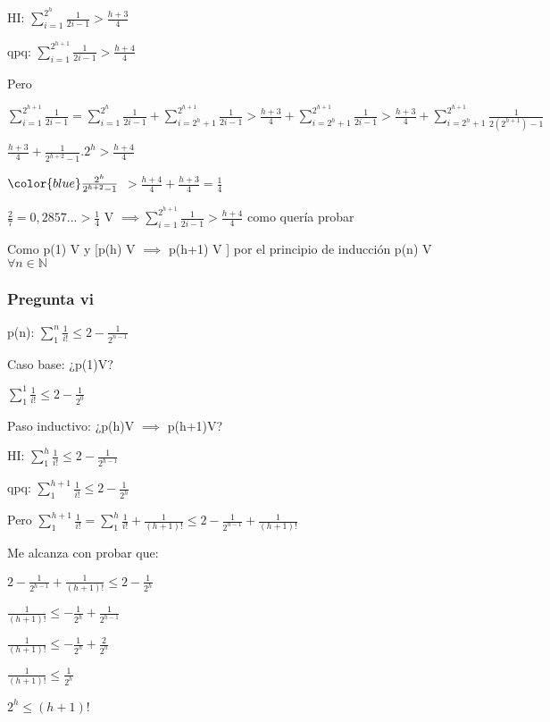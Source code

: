 HI: $\sum_{i=1}^{2^h}\frac{1}{2i-1} > \frac{h+3}{4}$

qpq: $\sum_{i=1}^{2^{h+1}}\frac{1}{2i-1} > \frac{h+4}{4}$

Pero

$\sum_{i=1}^{2^{h+1}}\frac{1}{2i-1}=\sum_{i=1}^{2^h}\frac{1}{2i-1}+\sum_{i=2^h+1}^{2^{h+1}}\frac{1}{2i-1} 
> \frac{h+3}{4} + \sum_{i=2^h+1}^{2^{h+1}}\frac{1}{2i-1}
> \frac{h+3}{4} + \sum_{i=2^h+1}^{2^{h+1}}\frac{1}{2(2^{h+1})-1}$

$\frac{h+3}{4} + \frac{1}{2^{h+2}-1}.2^h > \frac{h+4}{4}$

$\color{blue} \frac{2^h}{2^{h+2}-1}$ $> \frac{h+4}{4}+\frac{h+3}{4} = \frac{1}{4}$

{\color{blue} }

$\frac{2}{7}=0,2857...>\frac{1}{4}$ V $\implies \sum_{i=1}^{2^{h+1}}\frac{1}{2i-1} > \frac{h+4}{4}$ como quería probar

Como p(1) V y [p(h) V $\implies$ p(h+1) V ] por el principio de inducción p(n) V $\forall n \in \mathbb N$

\subsubsection{Pregunta vi}

p(n): $\sum_{1}^{n}\frac{1}{i!} \leqslant 2-\frac{1}{2^{n-1}}$

Caso base: ¿p(1)V? 

$\sum_{1}^{1}\frac{1}{i!} \leqslant 2-\frac{1}{2^{0}}$

Paso inductivo: ¿p(h)V $\implies$ p(h+1)V?

HI: $\sum_{1}^{h}\frac{1}{i!} \leqslant 2-\frac{1}{2^{h-1}}$

qpq: $\sum_{1}^{h+1}\frac{1}{i!} \leqslant 2-\frac{1}{2^{h}}$

Pero $\sum_{1}^{h+1}\frac{1}{i!} = \sum_{1}^{h}\frac{1}{i!} + \frac{1}{(h+1)!}
\leqslant 2-\frac{1}{2^{h-1}} + \frac{1}{(h+1)!}$

Me alcanza con probar que:

$2-\frac{1}{2^{h-1}} + \frac{1}{(h+1)!} \leqslant 2-\frac{1}{2^{h}}$

$\frac{1}{(h+1)!} \leqslant -\frac{1}{2^{h}} + \frac{1}{2^{h-1}}$

$\frac{1}{(h+1)!} \leqslant -\frac{1}{2^{h}} + \frac{2}{2^h}$

$\frac{1}{(h+1)!} \leqslant \frac{1}{2^h}$

$2^h \leqslant (h+1)!$


